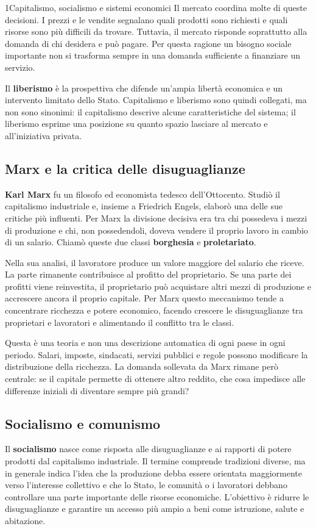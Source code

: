 \begin{lettura}{1}{Capitalismo, socialismo e sistemi economici}
Il mercato coordina molte di queste decisioni. I prezzi e le vendite segnalano quali prodotti sono richiesti e quali risorse sono più difficili da trovare. Tuttavia, il mercato risponde soprattutto alla domanda di chi desidera e può pagare. Per questa ragione un bisogno sociale importante non si trasforma sempre in una domanda sufficiente a finanziare un servizio.

Il \textbf{liberismo} è la prospettiva che difende un'ampia libertà economica e un intervento limitato dello Stato. Capitalismo e liberismo sono quindi collegati, ma non sono sinonimi: il capitalismo descrive alcune caratteristiche del sistema; il liberismo esprime una posizione su quanto spazio lasciare al mercato e all'iniziativa privata.

\subsection*{Marx e la critica delle disuguaglianze}
\textbf{Karl Marx} fu un filosofo ed economista tedesco dell'Ottocento. Studiò il capitalismo industriale e, insieme a Friedrich Engels, elaborò una delle sue critiche più influenti. Per Marx la divisione decisiva era tra chi possedeva i mezzi di produzione e chi, non possedendoli, doveva vendere il proprio lavoro in cambio di un salario. Chiamò queste due classi \textbf{borghesia} e \textbf{proletariato}.

Nella sua analisi, il lavoratore produce un valore maggiore del salario che riceve. La parte rimanente contribuisce al profitto del proprietario. Se una parte dei profitti viene reinvestita, il proprietario può acquistare altri mezzi di produzione e accrescere ancora il proprio capitale. Per Marx questo meccanismo tende a concentrare ricchezza e potere economico, facendo crescere le disuguaglianze tra proprietari e lavoratori e alimentando il conflitto tra le classi.

Questa è una teoria e non una descrizione automatica di ogni paese in ogni periodo. Salari, imposte, sindacati, servizi pubblici e regole possono modificare la distribuzione della ricchezza. La domanda sollevata da Marx rimane però centrale: se il capitale permette di ottenere altro reddito, che cosa impedisce alle differenze iniziali di diventare sempre più grandi?

\subsection*{Socialismo e comunismo}
Il \textbf{socialismo} nasce come risposta alle disuguaglianze e ai rapporti di potere prodotti dal capitalismo industriale. Il termine comprende tradizioni diverse, ma in generale indica l'idea che la produzione debba essere orientata maggiormente verso l'interesse collettivo e che lo Stato, le comunità o i lavoratori debbano controllare una parte importante delle risorse economiche. L'obiettivo è ridurre le disuguaglianze e garantire un accesso più ampio a beni come istruzione, salute e abitazione.


\end{lettura}

